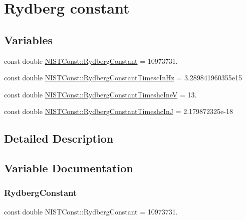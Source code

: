 \hypertarget{group___n_i_s_t_const-_rydberg_constant}{}\section{Rydberg constant}
\label{group___n_i_s_t_const-_rydberg_constant}
\subsection*{Variables}
\begin{DoxyCompactItemize}
\item 
const double \mbox{\hyperlink{group___n_i_s_t_const-_rydberg_constant_gaa434f78f9fead2fcf2e129a137853e26}{N\+I\+S\+T\+Const\+::\+Rydberg\+Constant}} = 10973731.
\item 
const double \mbox{\hyperlink{group___n_i_s_t_const-_rydberg_constant_ga473e14f2663eccecd987928be1d512ad}{N\+I\+S\+T\+Const\+::\+Rydberg\+Constant\+Timesc\+In\+Hz}} = 3.\+289841960355e15
\item 
const double \mbox{\hyperlink{group___n_i_s_t_const-_rydberg_constant_ga77c7dd314342e7f121d9b8775a45d20f}{N\+I\+S\+T\+Const\+::\+Rydberg\+Constant\+Timeshc\+IneV}} = 13.
\item 
const double \mbox{\hyperlink{group___n_i_s_t_const-_rydberg_constant_gaa4164006d51dbf240eb83065e83bddec}{N\+I\+S\+T\+Const\+::\+Rydberg\+Constant\+Timeshc\+InJ}} = 2.\+179872325e-\/18
\end{DoxyCompactItemize}


\subsection{Detailed Description}


\subsection{Variable Documentation}
\mbox{\label{group___n_i_s_t_const-_rydberg_constant_gaa434f78f9fead2fcf2e129a137853e26}} 
\subsubsection{\texorpdfstring{Rydberg\+Constant}{RydbergConstant}}
{\footnotesize\ttfamily const double N\+I\+S\+T\+Const\+::\+Rydberg\+Constant = 10973731.}

